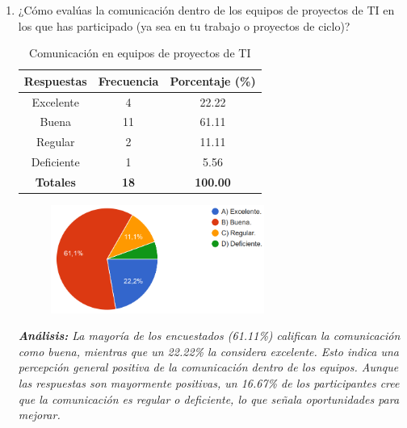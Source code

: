 \documentclass[journal]{IEEEtran}
\begin{document}
\begin{enumerate}
{}\\
	\item ¿Cómo evalúas la comunicación dentro de los equipos de proyectos de TI en los que has participado (ya sea en tu trabajo o proyectos de ciclo)?
	\begin{table}[H]
		\renewcommand{\arraystretch}{1.3}
		\centering
		\caption{Comunicación en equipos de proyectos de TI}
		\begin{tabular}{c c c}
			\hline
			\textbf{Respuestas} & \textbf{Frecuencia} & \textbf{Porcentaje (\%)}\\
			\hline
			Excelente & 4 & 22.22 \\
			Buena & 11 & 61.11 \\
			Regular & 2 & 11.11\\
			Deficiente & 1 & 5.56\\
			\hline
			\textbf{Totales} &\textbf{18}& \textbf{100.00}\\
			\hline
		\end{tabular}
	\end{table}
	\begin{figure}[h]
		\centering
		\includegraphics[width=07cm]{Pregunta13}
	\end{figure}
	\textit{\textbf{Análisis:} La mayoría de los encuestados (61.11\%) califican la comunicación como buena, mientras que un 22.22\% la considera excelente. Esto indica una percepción general positiva de la comunicación dentro de los equipos. Aunque las respuestas son mayormente positivas, un 16.67\% de los participantes cree que la comunicación es regular o deficiente, lo que señala oportunidades para mejorar.}\\
	

\end{enumerate}
\end{document}
